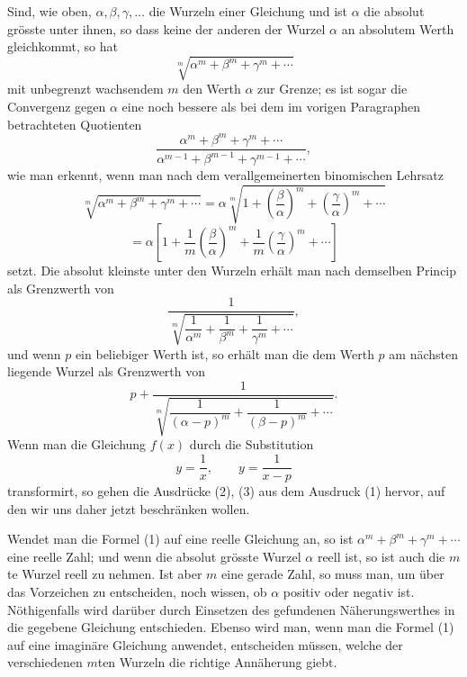 \documentclass[11pt]{article}
\begin{document}
Sind, wie oben, $\alpha,\beta,\gamma,\ldots$ die Wurzeln einer Gleichung und ist $\alpha$ die absolut grösste unter ihnen, so dass keine der anderen der Wurzel $\alpha$ an absolutem Werth gleichkommt, so hat
\begin{equation}
        \sqrt[m]{\alpha^m+\beta^m+\gamma^m+\cdots}
\tag{1}
\end{equation}
mit unbegrenzt wachsendem $m$ den Werth $\alpha$ zur Grenze; es ist sogar die Convergenz gegen $\alpha$ eine noch bessere als bei dem im vorigen Paragraphen betrachteten Quotienten
\[
        \frac{\alpha^m+\beta^m+\gamma^m+\cdots}
             {\alpha^{m-1}+\beta^{m-1}+\gamma^{m-1}+\cdots},
\]
wie man erkennt, wenn man nach dem verallgemeinerten binomischen Lehrsatz
\[
\sqrt[m]{\alpha^m+\beta^m+\gamma^m+\cdots}
=\alpha\sqrt[m]{1+\left(\frac{\beta}{\alpha}\right)^m+
                  \left(\frac{\gamma}{\alpha}\right)^m+\cdots}
\]
\[
=\alpha\left[1+\frac1m\left(\frac{\beta}{\alpha}\right)^m
+\frac1m\left(\frac{\gamma}{\alpha}\right)^m+\cdots\right]
\]
setzt. Die absolut kleinste unter den Wurzeln erhält man nach demselben Princip als Grenzwerth von
\begin{equation}
        \frac{1}{\sqrt[m]{\dfrac1{\alpha^m}+\dfrac1{\beta^m}
        +\dfrac1{\gamma^m}+\cdots}},
\tag{2}
\end{equation}
und wenn $p$ ein beliebiger Werth ist, so erhält man die dem Werth $p$ am nächsten liegende Wurzel als Grenzwerth von
\begin{equation}
        p+\frac{1}{\sqrt[m]{\dfrac1{(\alpha-p)^m}
        +\dfrac1{(\beta-p)^m}+\cdots}}.
\tag{3}
\end{equation}
Wenn man die Gleichung $f(x)$ durch die Substitution
\[
        y=\frac1x,\qquad y=\frac1{x-p}
\]
transformirt, so gehen die Ausdrücke (2), (3) aus dem Ausdruck (1) hervor, auf den wir uns daher jetzt beschränken wollen.

Wendet man die Formel (1) auf eine reelle Gleichung an, so ist $\alpha^m+\beta^m+\gamma^m+\cdots$ eine reelle Zahl; und wenn die absolut grösste Wurzel $\alpha$ reell ist, so ist auch die $m$te Wurzel reell zu nehmen. Ist aber $m$ eine gerade Zahl, so muss man, um über das Vorzeichen zu entscheiden, noch wissen, ob $\alpha$ positiv oder negativ ist. Nöthigenfalls wird darüber durch Einsetzen des gefundenen Näherungswerthes in die gegebene Gleichung entschieden. Ebenso wird man, wenn man die Formel (1) auf eine imaginäre Gleichung anwendet, entscheiden müssen, welche der verschiedenen $m$ten Wurzeln die richtige Annäherung giebt.
\end{document}
